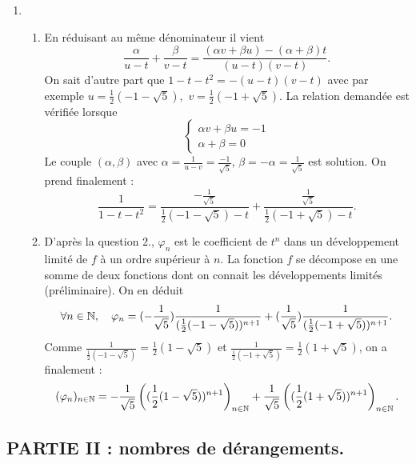 \begin{enumerate}
\item
\begin{enumerate}
\item  En r{\'e}duisant au m{\^e}me d{\'e}nominateur il vient
\[
\frac{\alpha }{u-t}+\frac{\beta }{v-t}=\frac{(\alpha v+\beta u)-(\alpha +\beta )t}{(u-t)(v-t)}.
\]
On sait d'autre part que $1-t-t^{2}=-(u-t)(v-t)$ avec par exemple $u=\frac{1}{2}(-1-\sqrt{5}),$ $v=\frac{1}{2}(-1+\sqrt{5})$. La relation demand{\'e}e
est v{\'e}rifi{\'e}e lorsque
\[
\left\{
\begin{array}{c}
\alpha v+\beta u=-1 \\
\alpha +\beta =0
\end{array}
\right.
\]
Le couple $(\alpha ,\beta )$ avec $\alpha =\frac{1}{u-v}=\frac{-1}{\sqrt{5}}$, $\beta =-\alpha =\frac{1}{\sqrt{5}}$ est solution. On prend finalement :
\[
\frac{1}{1-t-t^{2}}=\frac{-\frac{1}{\sqrt{5}}}{\frac{1}{2}(-1-\sqrt{5})-t} + \frac{\frac{1}{\sqrt{5}}}{\frac{1}{2}(-1+\sqrt{5})-t}.
\]

\item  D'apr{\`e}s la question 2., $\varphi _{n}$ est le coefficient de $t^{n}$ dans un d{\'e}veloppement limit{\'e} de $f$ {\`a} un ordre sup{\'e}rieur {\`a} $n$. La fonction $f$ se d{\'e}compose en une somme de deux fonctions dont on connait les d{\'e}veloppements limit{\'e}s (pr{\'e}liminaire). On en d{\'e}duit
\[
\forall n\in \mathbb{N},\quad \varphi _{n}
= (-\frac{1}{\sqrt{5}})\frac{1}{(\frac{1}{2}(-1-\sqrt{5}))^{n+1}} 
+ (\frac{1}{\sqrt{5}})\frac{1}{(\frac{1}{2}(-1 + \sqrt{5}))^{n+1}}.
\]
Comme $\frac{1}{\frac{1}{2}(-1-\sqrt{5})}=\frac{1}{2}(1-\sqrt{5})$ et $\frac{1}{\frac{1}{2}(-1+\sqrt{5})} = \frac{1}{2}(1+\sqrt{5})$, on a finalement :
\[
(\varphi _{n})_{n\in \mathbb{N}} 
=-\frac{1}{\sqrt{5}}\left( (\frac{1}{2}(1 - \sqrt{5}))^{n+1}\right) _{n\in \mathbb{N}}+\frac{1}{\sqrt{5}}\left( (\frac{1}{2}(1+\sqrt{5}))^{n+1}\right) _{n\in \mathbb{N}}.
\]
\end{enumerate}
\end{enumerate}

\subsection*{PARTIE II : nombres de d{\'e}rangements.}

